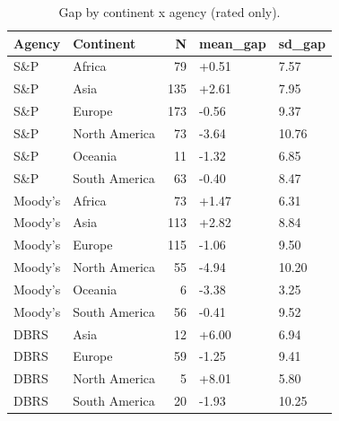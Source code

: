\begin{table}

\caption{\label{tab:tab:per_agency_gap_continent}Gap by continent x agency (rated only).}
\centering
\begin{tabular}[t]{llrll}
\toprule
Agency & Continent & N & mean\_gap & sd\_gap\\
\midrule
S\&P & Africa & 79 & +0.51 & 7.57\\
S\&P & Asia & 135 & +2.61 & 7.95\\
S\&P & Europe & 173 & -0.56 & 9.37\\
S\&P & North America & 73 & -3.64 & 10.76\\
S\&P & Oceania & 11 & -1.32 & 6.85\\
\addlinespace
S\&P & South America & 63 & -0.40 & 8.47\\
Moody's & Africa & 73 & +1.47 & 6.31\\
Moody's & Asia & 113 & +2.82 & 8.84\\
Moody's & Europe & 115 & -1.06 & 9.50\\
Moody's & North America & 55 & -4.94 & 10.20\\
\addlinespace
Moody's & Oceania & 6 & -3.38 & 3.25\\
Moody's & South America & 56 & -0.41 & 9.52\\
DBRS & Asia & 12 & +6.00 & 6.94\\
DBRS & Europe & 59 & -1.25 & 9.41\\
DBRS & North America & 5 & +8.01 & 5.80\\
\addlinespace
DBRS & South America & 20 & -1.93 & 10.25\\
\bottomrule
\end{tabular}
\end{table}
